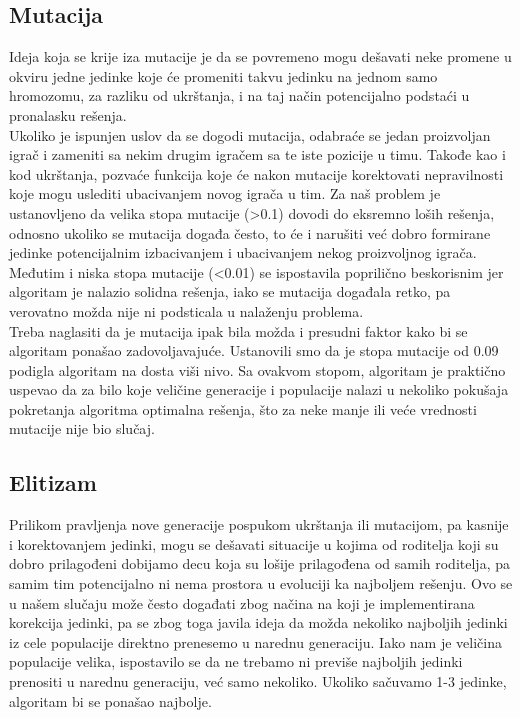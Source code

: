 \documentclass[a4paper]{article}
\begin{document}
\subsection{Mutacija}
Ideja koja se krije iza mutacije je da se povremeno mogu dešavati neke promene u okviru jedne jedinke koje će promeniti takvu jedinku na jednom samo hromozomu, za razliku od ukrštanja, i na taj način potencijalno podstaći u pronalasku rešenja. \\
Ukoliko je ispunjen uslov da se dogodi mutacija, odabraće se jedan proizvoljan igrač i zameniti sa nekim drugim igračem sa te iste pozicije u timu. Takođe kao i kod ukrštanja, pozvaće funkcija koje će nakon mutacije korektovati nepravilnosti koje mogu uslediti ubacivanjem novog igrača u tim.
Za naš problem je ustanovljeno da velika stopa mutacije (>0.1) dovodi do eksremno loših rešenja, odnosno ukoliko se mutacija događa često, to će i narušiti već dobro formirane jedinke potencijalnim izbacivanjem i ubacivanjem nekog proizvoljnog igrača. \\
Međutim i niska stopa mutacije (<0.01) se ispostavila poprilično beskorisnim jer algoritam je nalazio solidna rešenja, iako se mutacija događala retko, pa verovatno možda nije ni podsticala u nalaženju problema. \\
Treba naglasiti da je mutacija ipak bila možda i presudni faktor kako bi se algoritam ponašao zadovoljavajuće. Ustanovili smo da je stopa mutacije od 0.09 podigla algoritam na dosta viši nivo. Sa ovakvom stopom, algoritam je praktično uspevao da za bilo koje veličine generacije i populacije nalazi u nekoliko pokušaja pokretanja algoritma optimalna rešenja, što za neke manje ili veće vrednosti mutacije nije bio slučaj.

\subsection{Elitizam}
Prilikom pravljenja nove generacije pospukom ukrštanja ili mutacijom, pa kasnije i korektovanjem jedinki, mogu se dešavati situacije u kojima od roditelja koji su dobro prilagođeni dobijamo decu koja su lošije prilagođena od samih roditelja, pa samim tim potencijalno ni nema prostora u evoluciji ka najboljem rešenju. Ovo se u našem slučaju može često događati zbog načina na koji je implementirana korekcija jedinki, pa se zbog toga javila ideja da možda nekoliko najboljih jedinki iz cele populacije direktno prenesemo u narednu generaciju. Iako nam je veličina populacije velika, ispostavilo se da ne trebamo ni previše najboljih jedinki prenositi u narednu generaciju, već samo nekoliko. Ukoliko sačuvamo 1-3 jedinke, algoritam bi se ponašao najbolje.

\appendix
 


\appendix
\end{document}

